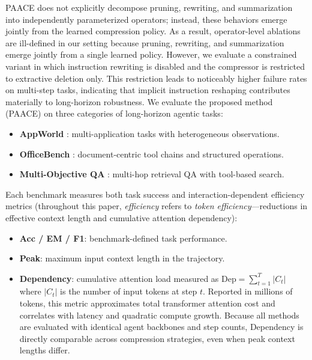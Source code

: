 \documentclass{article}
\theoremstyle{plain}
\theoremstyle{definition}
\theoremstyle{remark}
\begin{document}
PAACE does not explicitly decompose pruning, rewriting, and summarization into
independently parameterized operators; instead, these behaviors emerge jointly
from the learned compression policy.
As a result, operator-level ablations are ill-defined in our setting because pruning, rewriting, and summarization emerge jointly from a single learned policy.
However, we evaluate a constrained variant in which instruction rewriting is
disabled and the compressor is restricted to extractive deletion only.
This restriction leads to noticeably higher failure rates on multi-step tasks,
indicating that implicit instruction reshaping contributes materially to
long-horizon robustness. We evaluate the proposed method (PAACE) on three categories of long-horizon agentic tasks:
\vspace{-4pt}
\begin{itemize}\setlength{\itemsep}{0pt}\setlength{\parskip}{0pt}\setlength{\parsep}{0pt}
    \item \textbf{AppWorld} \citep{trivedi2024appworld}: multi-application tasks with heterogeneous observations.
    \item \textbf{OfficeBench} \citep{wang2024officebench}: document-centric tool chains and structured operations.
    \item \textbf{Multi-Objective QA} \citep{zhou2025mem1}: multi-hop retrieval QA with tool-based search.
\end{itemize}
\vspace{-4pt}

Each benchmark measures both task success and interaction-dependent efficiency metrics (throughout this paper, \emph{efficiency} refers to \emph{token efficiency}—reductions in effective context length and cumulative attention dependency):
\vspace{-4pt}
\begin{itemize}\setlength{\itemsep}{0pt}\setlength{\parskip}{0pt}\setlength{\parsep}{0pt}
    \item \textbf{Acc / EM / F1}: benchmark-defined task performance.
    \item \textbf{Peak}: maximum input context length in the trajectory.
 \item \textbf{Dependency}: cumulative attention load measured as
 $\mathrm{Dep} = \sum_{t=1}^{T} |C_t|$
 where $|C_t|$ is the number of input tokens at step $t$.
 Reported in millions of tokens, this metric approximates total
 transformer attention cost and correlates with latency and quadratic
 compute growth. Because all methods are evaluated with identical agent backbones and step
counts, Dependency is directly comparable across compression strategies,
even when peak context lengths differ.
\end{itemize}
\vspace{-4pt}
\end{document}
